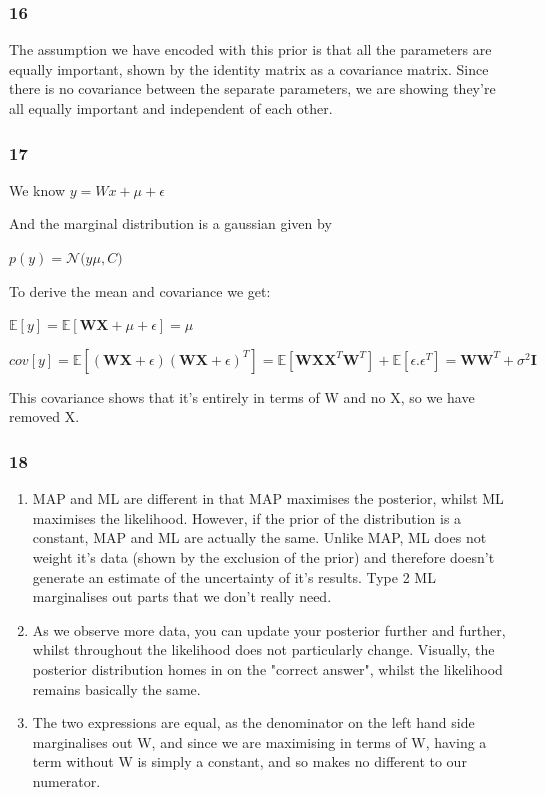 \documentclass[11pt]{article}
\begin{document}
    \subsubsection{16}\label{section}

The assumption we have encoded with this prior is that all the
parameters are equally important, shown by the identity matrix as a
covariance matrix. Since there is no covariance between the separate
parameters, we are showing they're all equally important and independent
of each other.

    \subsubsection{17}\label{section}

We know \(y = Wx + \mu + \epsilon\)

And the marginal distribution is a gaussian given by

\(p(y) = \mathcal{N}(y\)\textbar{}\(\mu, C)\)

To derive the mean and covariance we get:

\(\mathbb E[y] = \mathbb E[\pmb W\pmb X + \mu + \epsilon] = \mu\)

\(cov[y] = \mathbb E[(\pmb W\pmb X + \epsilon)(\pmb W\pmb X + \epsilon)^T] = \mathbb E[\pmb W\pmb X\pmb X^T\pmb W^T] + \mathbb E[\epsilon.\epsilon^T] = \pmb W\pmb W^T + \sigma^2\pmb I\)

This covariance shows that it's entirely in terms of W and no X, so we
have removed X.

    \subsubsection{18}\label{section}

\begin{enumerate}
\def\labelenumi{\alph{enumi})}
\item
  MAP and ML are different in that MAP maximises the posterior, whilst
  ML maximises the likelihood. However, if the prior of the distribution
  is a constant, MAP and ML are actually the same. Unlike MAP, ML does
  not weight it's data (shown by the exclusion of the prior) and
  therefore doesn't generate an estimate of the uncertainty of it's
  results. Type 2 ML marginalises out parts that we don't really need.
\item
  As we observe more data, you can update your posterior further and
  further, whilst throughout the likelihood does not particularly
  change. Visually, the posterior distribution homes in on the "correct
  answer", whilst the likelihood remains basically the same.
\item
  The two expressions are equal, as the denominator on the left hand
  side marginalises out W, and since we are maximising in terms of W,
  having a term without W is simply a constant, and so makes no
  different to our numerator.
\end{enumerate}
\end{document}
